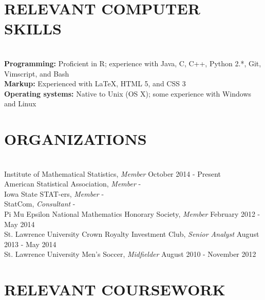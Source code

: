 \documentclass{res} %
\begin{document}
\begin{resume}

\section{RELEVANT COMPUTER SKILLS}

\hrulefill \\
{\bf Programming:} Proficient in R; experience with Java, C, C++, Python 2.*, Git,
Vimscript, and Bash \\
{\bf Markup:} Experienced with \LaTeX, HTML 5, and CSS 3 \\
{\bf Operating systems:} Native to Unix (OS X); some experience with Windows and Linux


\section{ORGANIZATIONS}

\hrulefill \\
Institute of Mathematical Statistics, {\sl Member} \hfill October 2014 - Present \\
American Statistical Association, {\sl Member} \hfill - \\
Iowa State STAT-ers, {\sl Member} \hfill - \\
StatCom, {\sl Consultant} \hfill - \\
Pi Mu Epsilon National Mathematics Honorary Society, {\sl Member} \hfill February 2012 - May 2014 \\
St. Lawrence University Crown Royalty Investment Club, {\sl Senior Analyst} \hfill August 2013 - May 2014 \\
St. Lawrence University Men's Soccer, {\sl Midfielder} \hfill August 2010 - November 2012 


\section{RELEVANT COURSEWORK}


\end{resume}
\end{document}
